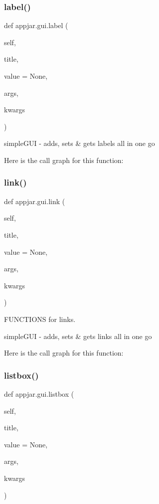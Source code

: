\subsubsection{\texorpdfstring{label()}{label()}}
{\footnotesize\ttfamily def appjar.\+gui.\+label (\begin{DoxyParamCaption}\item[{}]{self,  }\item[{}]{title,  }\item[{}]{value = {\ttfamily None},  }\item[{}]{args,  }\item[{}]{kwargs }\end{DoxyParamCaption})}

\begin{DoxyVerb}simpleGUI - adds, sets & gets labels all in one go \end{DoxyVerb}
 Here is the call graph for this function\+:
\mbox{\label{classappjar_1_1gui_aff45df581ebde9c15f5098e1f88b7d84}} 
\subsubsection{\texorpdfstring{link()}{link()}}
{\footnotesize\ttfamily def appjar.\+gui.\+link (\begin{DoxyParamCaption}\item[{}]{self,  }\item[{}]{title,  }\item[{}]{value = {\ttfamily None},  }\item[{}]{args,  }\item[{}]{kwargs }\end{DoxyParamCaption})}



F\+U\+N\+C\+T\+I\+O\+NS for links. 

\begin{DoxyVerb}simpleGUI - adds, sets & gets links all in one go \end{DoxyVerb}
 Here is the call graph for this function\+:
\mbox{\label{classappjar_1_1gui_a5e171d29e2588295ba6fd151c091ab70}} 
\subsubsection{\texorpdfstring{listbox()}{listbox()}}
{\footnotesize\ttfamily def appjar.\+gui.\+listbox (\begin{DoxyParamCaption}\item[{}]{self,  }\item[{}]{title,  }\item[{}]{value = {\ttfamily None},  }\item[{}]{args,  }\item[{}]{kwargs }\end{DoxyParamCaption})}



